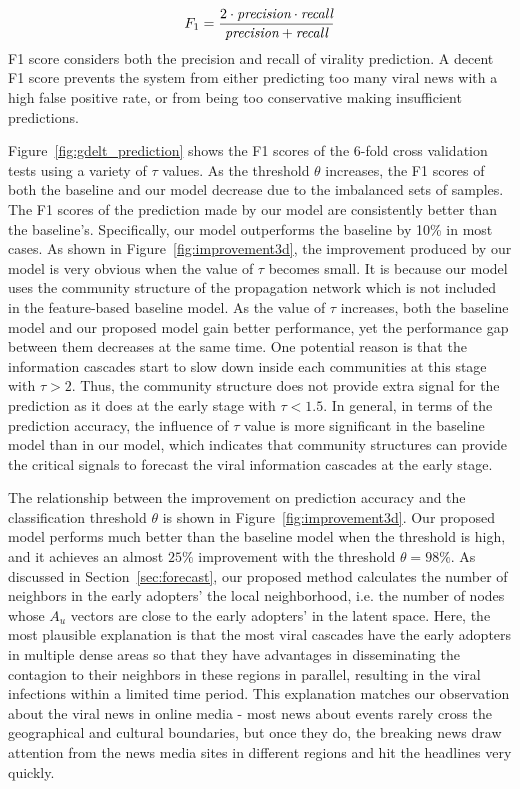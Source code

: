 \begin{equation}
F_1 = \frac{2 \cdot \text{\it precision}\cdot \text{\it recall}}{\text{\it precision}+\text{\it recall}}
\end{equation}
F1 score considers both the precision and recall of virality prediction. A decent F1 score prevents the system from either predicting too many viral news with a high false positive rate, or from being too conservative making insufficient predictions.

Figure~\ref{fig:gdelt_prediction} shows the F1 scores of the 6-fold cross validation tests using a variety of $\tau$ values. As the threshold $\theta$ increases, the F1 scores of both the baseline and our model decrease due to the imbalanced sets of samples. The F1 scores of the prediction made by our model are consistently better than the baseline's. Specifically, our model outperforms the baseline by 10\% in most cases. As shown in Figure~\ref{fig:improvement3d}, the improvement produced by our model is very obvious when the value of $\tau$ becomes small. It is because our model uses the community structure of the propagation network which is not included in the feature-based baseline model. As the value of $\tau$ increases, both the baseline model and our proposed model gain better performance, yet the performance gap between them decreases at the same time. One potential reason is that the information cascades start to slow down inside each communities at this stage with $\tau>2$. Thus, the community structure does not provide extra signal for the prediction as it does at the early stage with $\tau<1.5$. In general, in terms of the prediction accuracy, the influence of $\tau$ value is more significant in the baseline model than in our model, which indicates that community structures can provide the critical signals to forecast the viral information cascades at the early stage.

The relationship between the improvement on prediction accuracy and the classification threshold $\theta$ is shown in Figure~\ref{fig:improvement3d}. Our proposed model performs much better than the baseline model when the threshold is high, and it achieves an almost $25\%$ improvement with the threshold $\theta=98\%$. As discussed in Section~\ref{sec:forecast}, our proposed method calculates the number of neighbors in the early adopters' the local neighborhood, i.e. the number of nodes whose $A_u$ vectors are close to the early adopters' in the latent space. Here, the most plausible explanation is that the most viral cascades have the early adopters in multiple dense areas so that they have advantages in disseminating the contagion to their neighbors in these regions in parallel, resulting in the viral infections within a limited time period. This explanation matches our observation about the viral news in online media - most news about events rarely cross the geographical and cultural boundaries, but once they do, the breaking news draw attention from the news media sites in different regions and hit the headlines very quickly.

